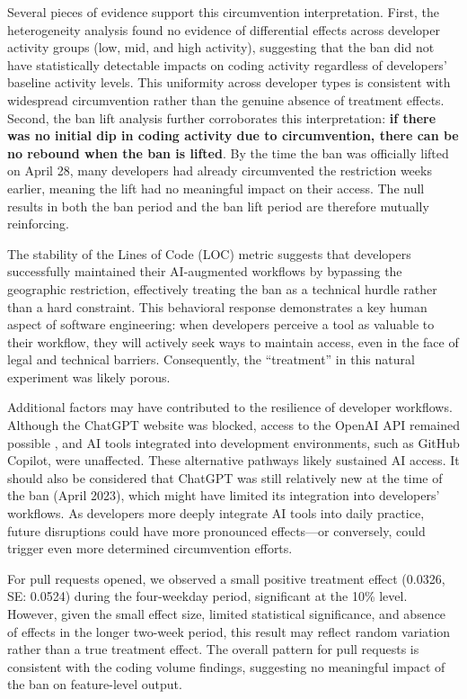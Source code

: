 Several pieces of evidence support this circumvention interpretation. First, the heterogeneity analysis found no evidence of differential effects across developer activity groups (low, mid, and high activity), suggesting that the ban did not have statistically detectable impacts on coding activity regardless of developers' baseline activity levels. This uniformity across developer types is consistent with widespread circumvention rather than the genuine absence of treatment effects. Second, the ban lift analysis further corroborates this interpretation: \textbf{if there was no initial dip in coding activity due to circumvention, there can be no rebound when the ban is lifted}. By the time the ban was officially lifted on April 28, many developers had already circumvented the restriction weeks earlier, meaning the lift had no meaningful impact on their access. The null results in both the ban period and the ban lift period are therefore mutually reinforcing.

The stability of the Lines of Code (LOC) metric suggests that developers successfully maintained their AI-augmented workflows by bypassing the geographic restriction, effectively treating the ban as a technical hurdle rather than a hard constraint. This behavioral response demonstrates a key human aspect of software engineering: when developers perceive a tool as valuable to their workflow, they will actively seek ways to maintain access, even in the face of legal and technical barriers. Consequently, the ``treatment'' in this natural experiment was likely porous.

Additional factors may have contributed to the resilience of developer workflows. Although the ChatGPT website was blocked, access to the OpenAI API remained possible \cite{saba2023chatgptbloccato}, and AI tools integrated into development environments, such as GitHub Copilot, were unaffected. These alternative pathways likely sustained AI access. It should also be considered that ChatGPT was still relatively new at the time of the ban (April 2023), which might have limited its integration into developers' workflows. As developers more deeply integrate AI tools into daily practice, future disruptions could have more pronounced effects---or conversely, could trigger even more determined circumvention efforts.

For pull requests opened, we observed a small positive treatment effect (0.0326, SE: 0.0524) during the four-weekday period, significant at the 10\% level. However, given the small effect size, limited statistical significance, and absence of effects in the longer two-week period, this result may reflect random variation rather than a true treatment effect. The overall pattern for pull requests is consistent with the coding volume findings, suggesting no meaningful impact of the ban on feature-level output.

